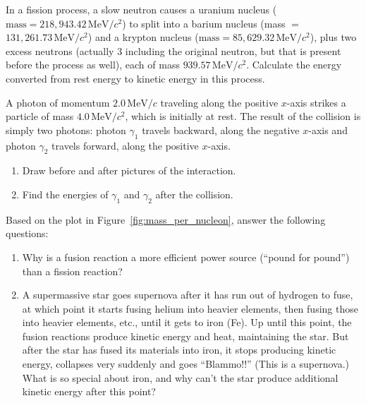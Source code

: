 \begin{exercise}
  In a fission process, a slow neutron causes a uranium nucleus
  ($\text{mass} = 218,943.42\,\text{MeV}/c^2$) to split into a barium
  nucleus (mass $=$  $131,261.73\,\text{MeV}/c^2$) and a krypton
  nucleus ($\text{mass} = 85,629.32\,\text{MeV}/c^2$), plus two
  excess neutrons (actually 3 including the original neutron, but that
  is present before the process as well), each of mass
  $939.57\,\text{MeV}/c^2$.  Calculate the energy converted from rest
  energy to kinetic energy in this process.
\end{exercise}



\begin{exercise}
  A photon of momentum $2.0\,\text{MeV}/c$ traveling along the
  positive $x$-axis strikes a particle of mass $4.0\,\text{MeV}/c^2$,
  which is initially at rest.  The result of the collision is simply
  two photons: photon $\gamma_1$ travels backward, along the negative
  $x$-axis and photon $\gamma_2$ travels forward, along the positive
  $x$-axis.
  \begin{enumerate}
  \item Draw before and after pictures of the interaction.
  \item Find the energies of $\gamma_1$ and $\gamma_2$ after the
    collision.
  \end{enumerate}
\end{exercise}

\begin{exercise}
  Based on the plot in Figure~\ref{fig:mass_per_nucleon}, answer the
  following questions:
  \begin{enumerate}
  \item Why is a fusion reaction a more efficient power source
    (``pound for pound'') than a fission reaction?
  \item A supermassive star goes supernova after it has run out of
    hydrogen to fuse, at which point it starts fusing helium into
    heavier elements, then fusing those into heavier elements, etc.,
    until it gets to iron (Fe).  Up until this point, the fusion
    reactions produce kinetic energy and heat, maintaining the star.
    But after the star has fused its materials into iron, it stops
    producing kinetic energy, collapses very suddenly and goes
    ``Blammo!!''  (This is a supernova.)  What is so special about
    iron, and why can't the star produce additional kinetic energy
    after this point?
  \end{enumerate}
\end{exercise}


